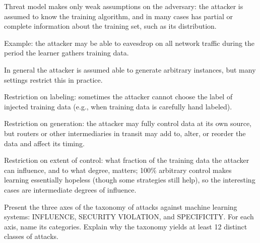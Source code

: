 \documentclass[10pt]{extarticle}
\newcommand{\resposta}[1]{\par\smallskip\noindent #1}
\begin{document}
\begin{questoes}
\resposta{
\begin{topicos}
\item Threat model makes only weak assumptions on the adversary: the attacker is assumed to know the training algorithm, and in many cases has partial or complete information about the training set, such as its distribution.
\item Example: the attacker may be able to eavesdrop on all network traffic during the period the learner gathers training data.
\item In general the attacker is assumed able to generate arbitrary instances, but many settings restrict this in practice.
\item Restriction on labeling: sometimes the attacker cannot choose the label of injected training data (e.g., when training data is carefully hand labeled).
\item Restriction on generation: the attacker may fully control data at its own source, but routers or other intermediaries in transit may add to, alter, or reorder the data and affect its timing.
\item Restriction on extent of control: what fraction of the training data the attacker can influence, and to what degree, matters; 100\% arbitrary control makes learning essentially hopeless (though some strategies still help), so the interesting cases are intermediate degrees of influence.
\end{topicos}
}

\item Present the three axes of the taxonomy of attacks against machine learning systems: INFLUENCE, SECURITY VIOLATION, and SPECIFICITY. For each axis, name its categories. Explain why the taxonomy yields at least 12 distinct classes of attacks.


\end{questoes}
\end{document}
